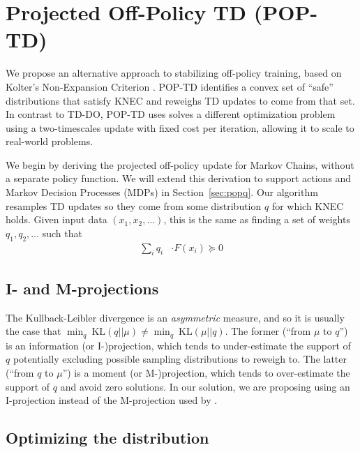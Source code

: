 
\section{Projected Off-Policy TD (POP-TD) }

We propose an alternative approach to stabilizing off-policy training, based on Kolter's Non-Expansion Criterion \citep{kolter2011fixed}. POP-TD identifies a convex set of ``safe'' distributions that satisfy KNEC and reweighs TD updates to come from that set. In contrast to TD-DO, POP-TD uses solves a different optimization problem using a two-timescales update with fixed cost per iteration, allowing it to scale to real-world problems.

We begin by deriving the projected off-policy update for Markov Chains, without a separate policy function. We will extend this derivation to support actions and Markov Decision Processes (MDPs) in Section~\ref{sec:popq}. Our algorithm resamples TD updates so they come from some distribution $q$ for which KNEC holds. Given input data $(x_1, x_2, \ldots)$, this is the same as finding a set of weights $q_1, q_2, \ldots$ such that
\begin{align}
  \sum_i q_i & \cdot F(x_i) \succcurlyeq 0
\end{align}


\subsection{I- and M-projections} \label{sec:improj}
The Kullback-Leibler divergence is an \emph{asymmetric} measure, and so it is usually the case that $\min_q~\text{KL}(q||\mu) \neq \min_q~\text{KL}(\mu||q)$. The former (``from $\mu$ to $q$'') is an information (or I-)projection, which tends to under-estimate the support of $q$ potentially excluding possible sampling distributions to reweigh to. The latter (``from $q$ to $\mu$'') is a moment (or M-)projection, which tends to over-estimate the support of $q$ and avoid zero solutions. In our solution, we are proposing using an I-projection instead of the M-projection used by \citet{kolter2011fixed}.


\subsection{Optimizing the distribution}
\label{sec:distriboptim}

